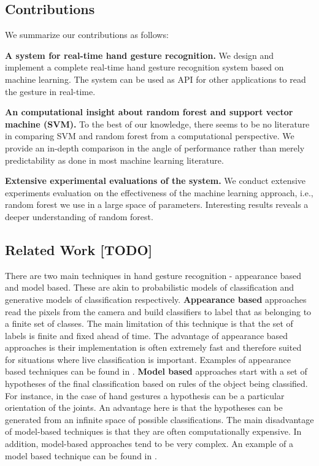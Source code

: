 \subsection{Contributions}

We summarize our contributions as follows:

\textbf{A system for real-time hand gesture recognition.} We design and implement a complete real-time hand gesture recognition system based on machine learning. The system can be used as API for other applications to read the gesture in real-time.

\textbf{An computational insight about random forest and support vector machine (SVM).} To the best of our knowledge, there seems to be no literature in comparing  SVM and random forest from a computational perspective. We provide an in-depth comparison in the angle of performance rather than merely predictability as done in most machine learning literature. 

\textbf{Extensive experimental evaluations of the system.} We conduct extensive experiments evaluation on the effectiveness of the machine learning approach, i.e., random forest we use in a large space of parameters. Interesting results reveals a deeper understanding of random forest. 

\subsection{Related Work [TODO]}

There are two main techniques in hand gesture recognition - appearance based and model based. These are akin to probabilistic models of classification and generative models of classification respectively. \textbf{Appearance based} approaches read the pixels from the camera and build classifiers to label that as belonging to a finite set of classes. The main limitation of this technique is that the set of labels is finite and fixed ahead of time. The advantage of appearance based approaches is their implementation is often extremely fast and therefore suited for situations where live classification is important. Examples of appearance based techniques can be found in \cite{shotton2011, wang2009}. \textbf{Model based} approaches start with a set of hypotheses of the final classification based on rules of the object being classified. For instance, in the case of hand gestures a hypothesis can be a particular orientation of the joints.  An advantage here is that the hypotheses can be generated from an infinite space of possible classifications. The main disadvantage of model-based techniques is that they are often computationally expensive. In addition, model-based approaches tend to be very complex. An example of a model based technique can be found in \cite{oikonomidis2011}.